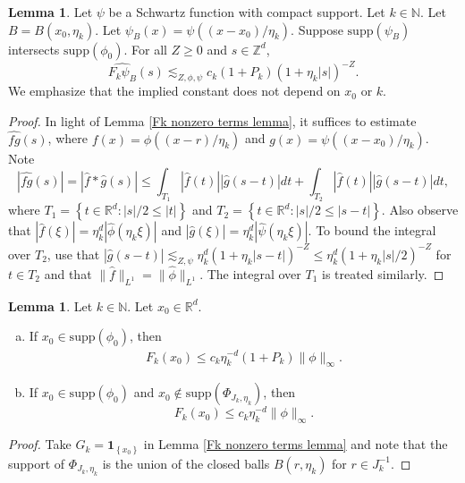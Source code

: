 \documentclass{amsart}
\numberwithin{equation}{section}
\theoremstyle{definition}
\newtheorem{lemma}[theorem]{Lemma}
\theoremstyle{definition}
\def\RR{\mathbb{R}}
\def\ZZ{\mathbb{Z}}
\def\NN{\mathbb{N}}
\def\supp{\mathrm{supp}}
\newcommand{\rbr}[1]{\left( {#1} \right)}
\newcommand{\cbr}[1]{ \left\{ {#1} \right\} }
\def\one{\mathbf{1}}
\begin{document}
\begin{lemma}\label{Fphi_decay}
Let $\psi$ be a Schwartz function with compact support. 
Let $k \in \NN$. Let $B = B(x_0,\eta_k)$. Let $\psi_{B}(x) = \psi((x-x_0)/\eta_k)$. 
Suppose $\supp(\psi_B)$ intersects $\supp(\phi_0)$.
For all $Z \geq 0$ and $s \in \ZZ^d$, 
$$
\widehat{F_k \psi_{B}}(s)
\lesssim_{Z,\phi, \psi}c_k (1+P_k)(1+\eta_k|s|)^{-Z}.
$$
We emphasize that the implied constant does not depend on $x_0$ or $k$. 
\end{lemma}
\begin{proof}
In light of Lemma \ref{Fk nonzero terms lemma}, it suffices to estimate 
$\widehat{fg}(s)$, where $f(x) = \phi\rbr{({x-r})/{\eta_k}}$ and $g(x) = \psi\rbr{({x-x_0})/{\eta_k}}$. 
Note
$$
|\widehat{fg}(s)| 
= 
|\widehat{f} \ast \widehat{g}(s)| 
\leq 
\int_{T_1} |\widehat{f}(t)| |\widehat{g}(s-t)| dt
+
\int_{T_2} |\widehat{f}(t)| |\widehat{g}(s-t)| dt, 
$$
where $T_1 = \cbr{t \in \RR^d: |s|/2 \leq |t|}$ and $T_2 = \cbr{t \in \RR^d: |s|/2 \leq |s-t|}$. 
Also observe that 
$|\widehat{f}(\xi)| = \eta_k^d |\widehat{\phi}(\eta_k \xi)|$ and 
$|\widehat{g}(\xi)| = \eta_k^d |\widehat{\psi}(\eta_k \xi)|$. 
To bound the integral over $T_2$, use that 
$|\widehat{g}(s-t)| \lesssim_{Z,\psi} \eta_k^d (1+\eta_k|s-t|)^{-Z} \leq \eta_k^d (1+\eta_k|s|/2)^{-Z}$ for $t \in T_2$ and that $\|\widehat{f}\|_{L^1}=\|\widehat{\phi}\|_{L^1}$. The integral over $T_1$ is treated similarly. 
\end{proof}


\begin{lemma}\label{Fk bound lemma}
Let $k \in \NN$.  Let $x_0 \in \RR
^d$. 
\begin{enumerate}[(a)]
\item 
If $x_0 \in \supp(\phi_0)$, then 
\begin{align*}
F_k(x_0) \leq c_k \eta_k^{-d}(1+P_k) \|\phi\|_{\infty}. 
\end{align*}
\item 
If $x_0 \in \supp(\phi_0)$ and $x_0 \notin \supp(\Phi_{J_k,\eta_k})$, 
then 
$$
F_k(x_0) \leq c_k \eta_k^{-d} \|\phi\|_{\infty}. 
$$
\end{enumerate}
\end{lemma}
\begin{proof}
Take $G_k = \one_{\cbr{x_0}}$ in Lemma \ref{Fk nonzero terms lemma} and note that the support of $\Phi_{J_k,\eta_k}$ is the union of the closed balls $B(r,\eta_k)$ for $r \in J_k^{-1}$. 
\end{proof}
\end{document}
